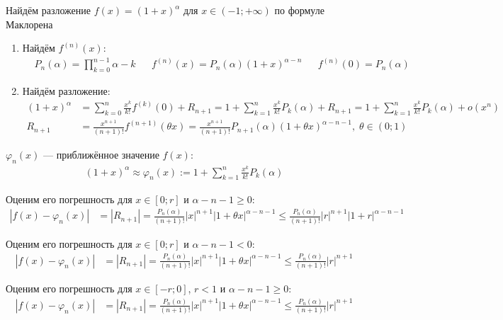 \documentclass{article}
\begin{document}

Найдём разложение $f(x)=(1+x)^{\alpha}$ для $x\in (-1;+\infty)$ по формуле Маклорена

\begin{enumerate}
	\item{}Найдём $f^{(n)}(x)$:
	\begin{align*}
		 & P_{n}(\alpha)=\prod_{k=0}^{n-1}\alpha-k &  & f^{(n)}(x)=P_{n}(\alpha)(1+x)^{\alpha-n} &  & f^{(n)}(0)=P_{n}(\alpha)
	\end{align*}
	\item{}Найдём разложение:
	\begin{align*}
		(1+x)^{\alpha} & =\sum_{k=0}^{n}\frac{x^{k}}{k!}f^{(k)}(0)+R_{n+1}=1+\sum_{k=1}^{n}\frac{x^{k}}{k!}P_{k}(\alpha)+R_{n+1}
		=1+\sum_{k=1}^{n}\frac{x^{k}}{k!}P_{k}(\alpha)+o(x^{n})                                                                                     \\
		R_{n+1}        & =\frac{x^{n+1}}{(n+1)!}f^{(n+1)}(\theta x)=\frac{x^{n+1}}{(n+1)!}P_{n+1}(\alpha)(1+\theta x)^{\alpha-n-1},\;\theta\in(0;1)
	\end{align*}
\end{enumerate}

$\varphi_{n}(x)$ --- приближённое значение $f(x)$:
\begin{align*}
	(1+x)^{\alpha}\approx\varphi_{n}(x):=1+\sum_{k=1}^{n}\frac{x^{k}}{k!}P_{k}(\alpha)
\end{align*}

\pagebreak

Оценим его погрешность для $x\in[0;r]$ и $\alpha-n-1\geq 0$:
\begin{align*}
	|f(x)-\varphi_{n}(x)| & =|R_{n+1}|=\frac{P_{n}(\alpha)}{(n+1)!}|x|^{n+1}|1+\theta x|^{\alpha-n-1}
	\leq\frac{P_{n}(\alpha)}{(n+1)!}|r|^{n+1}|1+r|^{\alpha-n-1}
\end{align*}

Оценим его погрешность для $x\in[0;r]$ и $\alpha-n-1<0$:
\begin{align*}
	|f(x)-\varphi_{n}(x)| & =|R_{n+1}|=\frac{P_{n}(\alpha)}{(n+1)!}|x|^{n+1}|1+\theta x|^{\alpha-n-1}
	\leq\frac{P_{n}(\alpha)}{(n+1)!}|r|^{n+1}
\end{align*}

Оценим его погрешность для $x\in[-r;0]$, $r<1$ и $\alpha-n-1\geq 0$:
\begin{align*}
	|f(x)-\varphi_{n}(x)| & =|R_{n+1}|=\frac{P_{n}(\alpha)}{(n+1)!}|x|^{n+1}|1+\theta x|^{\alpha-n-1}
	\leq\frac{P_{n}(\alpha)}{(n+1)!}|r|^{n+1}
\end{align*}
\end{document}
